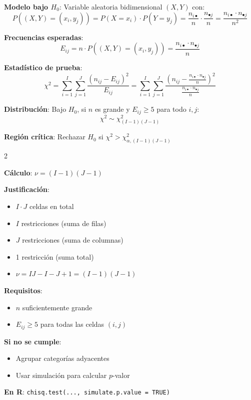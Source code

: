 \documentclass[10pt,a4paper]{article}
\begin{document}
\begin{tcolorbox}[title=Test $\chi^2$ de Independencia]
    \textbf{Modelo bajo $H_0$}: Variable aleatoria bidimensional $(X, Y)$ con:
    \[
        P((X, Y) = (x_i, y_j)) = P(X = x_i) \cdot P(Y = y_j) = \frac{n_{i \bullet}}{n} \cdot \frac{n_{\bullet j}}{n} = \frac{n_{i \bullet} \cdot n_{\bullet j}}{n^2}
    \]
    
    \textbf{Frecuencias esperadas}:
    \[
        E_{ij} = n \cdot P((X, Y) = (x_i, y_j)) = \frac{n_{i \bullet} \cdot n_{\bullet j}}{n}
    \]
    
    \textbf{Estadístico de prueba}:
    \[
        \chi^2 = \sum_{i=1}^I \sum_{j=1}^J \frac{(n_{ij} - E_{ij})^2}{E_{ij}} = \sum_{i=1}^I \sum_{j=1}^J \frac{\left(n_{ij} - \frac{n_{i \bullet} \cdot n_{\bullet j}}{n}\right)^2}{\frac{n_{i \bullet} \cdot n_{\bullet j}}{n}}
    \]
    
    \textbf{Distribución}: Bajo $H_0$, si $n$ es grande y $E_{ij} \geq 5$ para todo $i, j$:
    \[
        \chi^2 \sim \chi^2_{(I-1)(J-1)}
    \]
    
    \textbf{Región crítica}: Rechazar $H_0$ si $\chi^2 > \chi^2_{\alpha, (I-1)(J-1)}$
\end{tcolorbox}

\begin{multicols}{2}
    \begin{tcolorbox}[title=Grados de Libertad, equal height group=IH1]
        \textbf{Cálculo}: $\nu = (I-1)(J-1)$
        
        \textbf{Justificación}:
        \begin{itemize}
            \item $I \cdot J$ celdas en total
            \item $I$ restricciones (suma de filas)
            \item $J$ restricciones (suma de columnas)
            \item 1 restricción (suma total)
            \item $\nu = IJ - I - J + 1 = (I-1)(J-1)$
        \end{itemize}
    \end{tcolorbox}
    \begin{tcolorbox}[title=Condiciones de Aplicación, equal height group=IH1]
        \textbf{Requisitos}:
        \begin{itemize}
            \item $n$ suficientemente grande
            \item $E_{ij} \geq 5$ para todas las celdas $(i, j)$
        \end{itemize}
        
        \textbf{Si no se cumple}:
        \begin{itemize}
            \item Agrupar categorías adyacentes
            \item Usar simulación para calcular $p$-valor
        \end{itemize}
        
        \textbf{En R}: \texttt{chisq.test(..., simulate.p.value = TRUE)}
    \end{tcolorbox}
\end{multicols}
\end{document}
